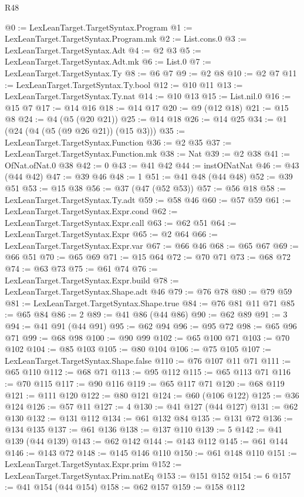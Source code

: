 \begin{lexlean}{R48}
\begin{coremodule}
@0 := LexLeanTarget.TargetSyntax.Program
@1 := LexLeanTarget.TargetSyntax.Program.mk
@2 := List.cons.{0}
@3 := LexLeanTarget.TargetSyntax.Adt
@4 := @2 @3
@5 := LexLeanTarget.TargetSyntax.Adt.mk
@6 := List.{0}
@7 := LexLeanTarget.TargetSyntax.Ty
@8 := @6 @7
@9 := @2 @8
@10 := @2 @7
@11 := LexLeanTarget.TargetSyntax.Ty.bool
@12 := @10 @11
@13 := LexLeanTarget.TargetSyntax.Ty.nat
@14 := @10 @13
@15 := List.nil.{0}
@16 := @15 @7
@17 := @14 @16
@18 := @14 @17
@20 := @9 (@12 @18)
@21 := @15 @8
@24 := @4 (@5 (@20 @21))
@25 := @14 @18
@26 := @14 @25
@34 := @1 (@24 (@4 (@5 (@9 @26 @21)) (@15 @3)))
@35 := LexLeanTarget.TargetSyntax.Function
@36 := @2 @35
@37 := LexLeanTarget.TargetSyntax.Function.mk
@38 := Nat
@39 := @2 @38
@41 := OfNat.ofNat.{0} @38
@42 := 0
@43 := @41 @42
@44 := instOfNatNat
@46 := @43 (@44 @42)
@47 := @39 @46
@48 := 1
@51 := @41 @48 (@44 @48)
@52 := @39 @51
@53 := @15 @38
@56 := @37 (@47 (@52 @53))
@57 := @56 @18
@58 := LexLeanTarget.TargetSyntax.Ty.adt
@59 := @58 @46
@60 := @57 @59
@61 := LexLeanTarget.TargetSyntax.Expr.cond
@62 := LexLeanTarget.TargetSyntax.Expr.call
@63 := @62 @51
@64 := LexLeanTarget.TargetSyntax.Expr
@65 := @2 @64
@66 := LexLeanTarget.TargetSyntax.Expr.var
@67 := @66 @46
@68 := @65 @67
@69 := @66 @51
@70 := @65 @69
@71 := @15 @64
@72 := @70 @71
@73 := @68 @72
@74 := @63 @73
@75 := @61 @74
@76 := LexLeanTarget.TargetSyntax.Expr.build
@78 := LexLeanTarget.TargetSyntax.Shape.adt @46
@79 := @76 @78
@80 := @79 @59
@81 := LexLeanTarget.TargetSyntax.Shape.true
@84 := @76 @81 @11 @71
@85 := @65 @84
@86 := 2
@89 := @41 @86 (@44 @86)
@90 := @62 @89
@91 := 3
@94 := @41 @91 (@44 @91)
@95 := @62 @94
@96 := @95 @72
@98 := @65 @96 @71
@99 := @68 @98
@100 := @90 @99
@102 := @65 @100 @71
@103 := @70 @102
@104 := @85 @103
@105 := @80 @104
@106 := @75 @105
@107 := LexLeanTarget.TargetSyntax.Shape.false
@110 := @76 @107 @11 @71
@111 := @65 @110
@112 := @68 @71
@113 := @95 @112
@115 := @65 @113 @71
@116 := @70 @115
@117 := @90 @116
@119 := @65 @117 @71
@120 := @68 @119
@121 := @111 @120
@122 := @80 @121
@124 := @60 (@106 @122)
@125 := @36 @124
@126 := @57 @11
@127 := 4
@130 := @41 @127 (@44 @127)
@131 := @62 @130
@132 := @131 @112
@134 := @61 @132 @84
@135 := @131 @72
@136 := @134 @135
@137 := @61 @136
@138 := @137 @110
@139 := 5
@142 := @41 @139 (@44 @139)
@143 := @62 @142
@144 := @143 @112
@145 := @61 @144
@146 := @143 @72
@148 := @145 @146 @110
@150 := @61 @148 @110
@151 := LexLeanTarget.TargetSyntax.Expr.prim
@152 := LexLeanTarget.TargetSyntax.Prim.natEq
@153 := @151 @152
@154 := 6
@157 := @41 @154 (@44 @154)
@158 := @62 @157
@159 := @158 @112

\end{coremodule}
\end{lexlean}
